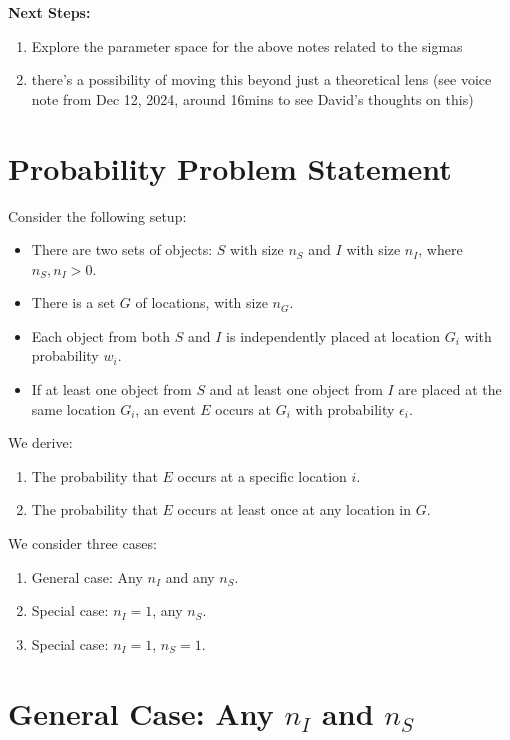 \documentclass[11pt]{article}
\begin{document}
\textbf{Next Steps:}
\begin{enumerate}
    \item Explore the parameter space for the above notes related to the sigmas 
    \item there's a possibility of moving this beyond just a theoretical lens (see voice note from Dec 12, 2024, around 16mins to see David's thoughts on this) 
\end{enumerate}


\section{Probability Problem Statement}

Consider the following setup:
\begin{itemize}
    \item There are two sets of objects: \( S \) with size \( n_S \) and \( I \) with size \( n_I \), where \( n_S, n_I > 0 \).
    \item There is a set \( G \) of locations, with size \( n_G \).
    \item Each object from both \( S \) and \( I \) is independently placed at location \( G_i \) with probability \( w_i \).
    \item If at least one object from \( S \) and at least one object from \( I \) are placed at the same location \( G_i \), an event \( E \) occurs at \( G_i \) with probability \( \epsilon_i \).
\end{itemize}

We derive:
\begin{enumerate}
    \item The probability that \( E \) occurs at a specific location \( i \).
    \item The probability that \( E \) occurs at least once at any location in \( G \).
\end{enumerate}

We consider three cases:
\begin{enumerate}
    \item General case: Any \( n_I \) and any \( n_S \).
    \item Special case: \( n_I = 1 \), any \( n_S \).
    \item Special case: \( n_I = 1 \), \( n_S = 1 \).
\end{enumerate}

\section{General Case: Any \( n_I \) and \( n_S \)}
\end{document}
